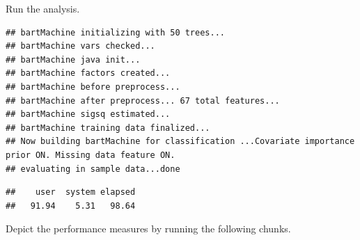 \documentclass[]{article}
\newenvironment{Shaded}{\begin{snugshade}}{\end{snugshade}}
\newcommand{\CommentTok}[1]{\textcolor[rgb]{0.56,0.35,0.01}{\textit{#1}}}
\newcommand{\DataTypeTok}[1]{\textcolor[rgb]{0.13,0.29,0.53}{#1}}
\newcommand{\DecValTok}[1]{\textcolor[rgb]{0.00,0.00,0.81}{#1}}
\newcommand{\KeywordTok}[1]{\textcolor[rgb]{0.13,0.29,0.53}{\textbf{#1}}}
\newcommand{\NormalTok}[1]{#1}
\newcommand{\OperatorTok}[1]{\textcolor[rgb]{0.81,0.36,0.00}{\textbf{#1}}}
\newcommand{\OtherTok}[1]{\textcolor[rgb]{0.56,0.35,0.01}{#1}}
\newcommand{\StringTok}[1]{\textcolor[rgb]{0.31,0.60,0.02}{#1}}
\begin{document}
Run the analysis.

\begin{Shaded}
\end{Shaded}

\begin{verbatim}
## bartMachine initializing with 50 trees...
## bartMachine vars checked...
## bartMachine java init...
## bartMachine factors created...
## bartMachine before preprocess...
## bartMachine after preprocess... 67 total features...
## bartMachine sigsq estimated...
## bartMachine training data finalized...
## Now building bartMachine for classification ...Covariate importance prior ON. Missing data feature ON. 
## evaluating in sample data...done
\end{verbatim}

\begin{verbatim}
##    user  system elapsed 
##   91.94    5.31   98.64
\end{verbatim}

Depict the performance measures by running the following chunks.

\begin{Shaded}
\end{Shaded}

\begin{Shaded}
\end{Shaded}
\end{document}
